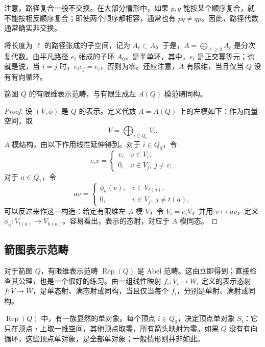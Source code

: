 注意，路径复合一般不交换。在大部分情形中，如果 $p,q$ 能按某个顺序复合，就不能按相反顺序复合；即使两个顺序都相容，通常也有 $pq\ne qp$。因此，路径代数通常确实非交换。

将长度为 $\ell$ 的路径张成的子空间，记为 $A_\ell\subset A$。于是，$A=\bigoplus_{\ell\ge0}A_\ell$ 是分次复代数。由平凡路径 $e_i$ 张成的子环 $A_0$，是半单环，其中，$e_i$ 是正交幂等元；也就是说，当 $i=j$ 时，$e_ie_j=e_i$，否则为零。还应注意，$A$ 有限维，当且仅当 $Q$ 没有有向循环。

\begin{proposition}\label{prop:4.28}
箭图 $Q$ 的有限维表示范畴，与有限生成左 $A(Q)$ 模范畴同构。
\end{proposition}
\begin{proof}
设 $(V,\phi)$ 是 $Q$ 的表示。定义代数 $A=A(Q)$ 上的左模如下：作为向量空间，取
\[
V=\bigoplus_{i\in Q_0}V_i.
\]
$A$ 模结构，由以下作用线性延伸得到。对于 $i\in Q_0$，令
\[
e_iv=\begin{cases}v,&v\in V_i,\\0,&v\in V_j,\ j\ne i;\end{cases}
\]
对于 $a\in Q_1$，令
\[
av=\begin{cases}\phi_a(v),&v\in V_{t(a)},\\0,&v\in V_j,\ j\ne t(a).\end{cases}
\]
可以反过来作这一构造：给定有限维左 $A$ 模 $V$，令 $V_i=e_iV$，并用 $v\mapsto av$，定义 $\phi_a\colon V_{t(a)}\to V_{h(a)}$。容易看出，表示的态射，对应于 $A$ 模同态。\BookQED
\end{proof}

\subsection{箭图表示范畴}\label{sec:4.2.3}

对于箭图 $Q$，有限维表示范畴 $\operatorname{Rep}(Q)$ 是 Abel 范畴。这由立即得到；直接检查其公理，也是一个很好的练习。由一组线性映射 $f_i\colon V_i\to W_i$ 定义的表示态射 $f\colon V\to W$，是单态射、满态射或同构，当且仅当每个 $f_i$，分别是单射、满射或同构。

$\operatorname{Rep}(Q)$ 中，有一族显然的单对象。每个顶点 $i\in Q_0$，决定顶点单对象 $S_i$：它只在顶点 $i$ 上取一维空间，其他顶点取零，所有箭头映射为零。如果 $Q$ 没有有向循环，这些顶点单对象，是全部单对象；一般情形则并非如此。


